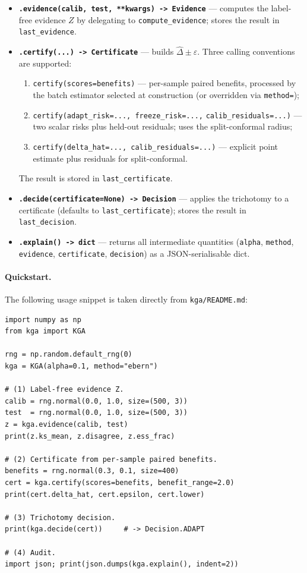 \begin{itemize}
  \item \textbf{\texttt{.evidence(calib, test, **kwargs) -> Evidence}} ---
    computes the label-free evidence $Z$ by delegating to
    \texttt{compute\_evidence}; stores the result in \texttt{last\_evidence}.

  \item \textbf{\texttt{.certify(...) -> Certificate}} --- builds $\widehat\Delta
    \pm \varepsilon$.  Three calling conventions are supported:
    \begin{enumerate}
      \item \texttt{certify(scores=benefits)} --- per-sample paired benefits,
        processed by the batch estimator selected at construction (or overridden
        via \texttt{method=});
      \item \texttt{certify(adapt\_risk=..., freeze\_risk=...,}
        \texttt{calib\_residuals=...)} --- two scalar risks plus held-out
        residuals; uses the split-conformal radius;
      \item \texttt{certify(delta\_hat=..., calib\_residuals=...)} --- explicit
        point estimate plus residuals for split-conformal.
    \end{enumerate}
    The result is stored in \texttt{last\_certificate}.

  \item \textbf{\texttt{.decide(certificate=None) -> Decision}} --- applies the
    trichotomy to a certificate (defaults to \texttt{last\_certificate}); stores
    the result in \texttt{last\_decision}.

  \item \textbf{\texttt{.explain() -> dict}} --- returns all intermediate
    quantities (\texttt{alpha}, \texttt{method}, \texttt{evidence},
    \texttt{certificate}, \texttt{decision}) as a JSON-serialisable dict.
\end{itemize}

\paragraph{Quickstart.}
The following usage snippet is taken directly from \texttt{kga/README.md}:

\begin{verbatim}
import numpy as np
from kga import KGA

rng = np.random.default_rng(0)
kga = KGA(alpha=0.1, method="ebern")

# (1) Label-free evidence Z.
calib = rng.normal(0.0, 1.0, size=(500, 3))
test  = rng.normal(0.0, 1.0, size=(500, 3))
z = kga.evidence(calib, test)
print(z.ks_mean, z.disagree, z.ess_frac)

# (2) Certificate from per-sample paired benefits.
benefits = rng.normal(0.3, 0.1, size=400)
cert = kga.certify(scores=benefits, benefit_range=2.0)
print(cert.delta_hat, cert.epsilon, cert.lower)

# (3) Trichotomy decision.
print(kga.decide(cert))     # -> Decision.ADAPT

# (4) Audit.
import json; print(json.dumps(kga.explain(), indent=2))
\end{verbatim}

